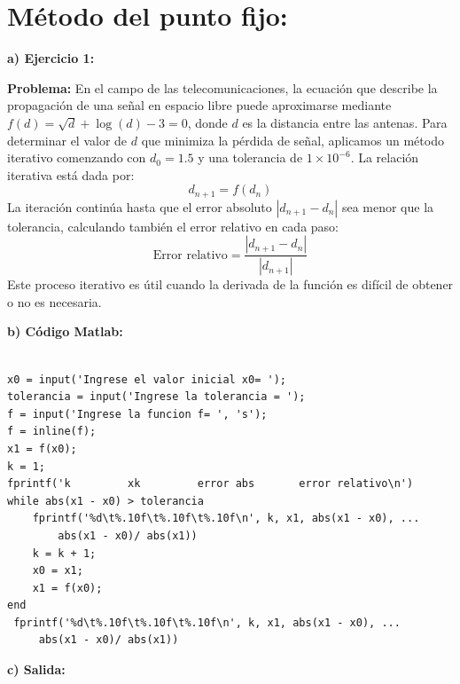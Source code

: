 \documentclass[12pt,a4paper,twoside]{article}  %
\begin{document}
\section{Método del punto fijo: }

\textbf{a) Ejercicio 1: }

\textbf{Problema:} En el campo de las telecomunicaciones, la ecuación que describe la propagación de una señal en espacio libre puede aproximarse mediante \( f(d) = \sqrt{d} + \log(d) - 3 = 0 \), donde \( d \) es la distancia entre las antenas. Para determinar el valor de \( d \) que minimiza la pérdida de señal, aplicamos un método iterativo comenzando con \( d_0 = 1.5 \) y una tolerancia de \( 1 \times 10^{-6} \). La relación iterativa está dada por:
\[
d_{n+1} = f(d_n)
\]
La iteración continúa hasta que el error absoluto \( |d_{n+1} - d_n| \) sea menor que la tolerancia, calculando también el error relativo en cada paso:
\[
\text{Error relativo} = \frac{|d_{n+1} - d_n|}{|d_{n+1}|}
\]
Este proceso iterativo es útil cuando la derivada de la función es difícil de obtener o no es necesaria.



\textbf{b) Código Matlab:}

\begin{lstlisting}

x0 = input('Ingrese el valor inicial x0= ');
tolerancia = input('Ingrese la tolerancia = ');
f = input('Ingrese la funcion f= ', 's');
f = inline(f);
x1 = f(x0);
k = 1;
fprintf('k         xk         error abs       error relativo\n')
while abs(x1 - x0) > tolerancia
    fprintf('%d\t%.10f\t%.10f\t%.10f\n', k, x1, abs(x1 - x0), ...
        abs(x1 - x0)/ abs(x1))
    k = k + 1;
    x0 = x1;
    x1 = f(x0);
end
 fprintf('%d\t%.10f\t%.10f\t%.10f\n', k, x1, abs(x1 - x0), ...
     abs(x1 - x0)/ abs(x1))

\end{lstlisting}

\textbf{c) Salida:}
\end{document}
